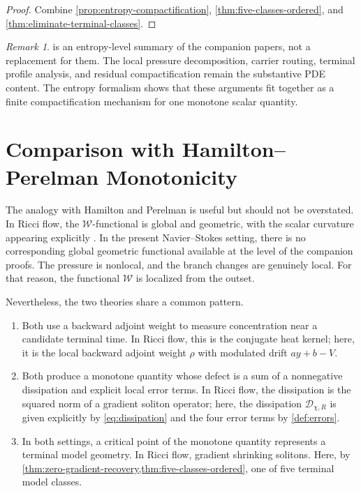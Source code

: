 \documentclass[11pt]{amsart}
\numberwithin{equation}{section}
\theoremstyle{plain}
\theoremstyle{definition}
\theoremstyle{remark}
\newtheorem{remark}[theorem]{Remark}
\newcommand{\Wloc}{\mathcal W}
\newcommand{\Diss}{\mathcal D}
\begin{document}
\begin{proof}
Combine
\cref{prop:entropy-compactification},
\cref{thm:five-classes-ordered}, and
\cref{thm:eliminate-terminal-classes}.
\end{proof}

\begin{remark}
 is an entropy-level summary of the
companion papers, not a replacement for them.  The local pressure
decomposition, carrier routing, terminal profile analysis, and residual
compactification remain the substantive PDE content.  The entropy
formalism shows that these arguments fit together as a finite
compactification mechanism for one monotone scalar quantity.
\end{remark}

\section{Comparison with Hamilton--Perelman Monotonicity}
\label{sec:hamilton-perelman}

The analogy with Hamilton and Perelman is useful but should not be
overstated.  In Ricci flow, the \(\mathcal W\)-functional is global and
geometric, with the scalar curvature appearing explicitly
\cite{Hamilton1982,Perelman2002}.  In the present Navier--Stokes setting,
there is no corresponding global geometric functional available at the
level of the companion proofs.  The pressure is nonlocal, and the branch
changes are genuinely local.  For that reason, the functional \(\Wloc\) is
localized from the outset.

Nevertheless, the two theories share a common pattern.

\begin{enumerate}[label=\textup{(\arabic*)},leftmargin=2.2em]
	\item Both use a backward adjoint weight to measure concentration near a
	candidate terminal time.  In Ricci flow, this is the conjugate heat
	kernel; here, it is the local backward adjoint weight \(\rho\) with
	modulated drift \(a y+b-V\).
	\item Both produce a monotone quantity whose defect is a sum of a
	nonnegative dissipation and explicit local error terms.  In Ricci flow,
	the dissipation is the squared norm of a gradient soliton operator; here,
	the dissipation \(\Diss_{\chi,R}\) is given explicitly by
	\eqref{eq:dissipation} and the four error terms by
	\cref{def:errors}.
	\item In both settings, a critical point of the monotone quantity
	represents a terminal model geometry.  In Ricci flow, gradient shrinking
	solitons.  Here, by
	\cref{thm:zero-gradient-recovery,thm:five-classes-ordered}, one of five
	terminal model classes.
\end{enumerate}
\end{document}
